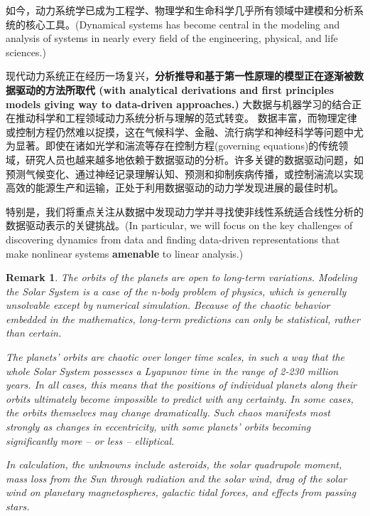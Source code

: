 \documentclass{ctexart}
\newtheorem*{remark}{Remark}
\begin{document}
如今，动力系统学已成为工程学、物理学和生命科学几乎所有领域中建模和分析系统的核心工具。(Dynamical systems
has become central in the modeling and analysis of systems in nearly every field of the
engineering, physical, and life sciences.)


现代动力系统正在经历一场复兴，\textbf{分析推导和基于第一性原理的模型正在逐渐被数据驱动的方法所取代 (with analytical derivations and first principles models giving way to data-driven approaches.)} 大数据与机器学习的结合正在推动科学和工程领域动力系统分析与理解的范式转变。
数据丰富，而物理定律或控制方程仍然难以捉摸，这在气候科学、金融、流行病学和神经科学等问题中尤为显著。即使在诸如光学和湍流等存在控制方程(governing equations)的传统领域，研究人员也越来越多地依赖于数据驱动的分析。许多关键的数据驱动问题，如预测气候变化、通过神经记录理解认知、预测和抑制疾病传播，或控制湍流以实现高效的能源生产和运输，正处于利用数据驱动的动力学发现进展的最佳时机。


特别是，我们将重点关注从数据中发现动力学并寻找使非线性系统适合线性分析的数据驱动表示的关键挑战。(In particular, we will focus on the key challenges of discovering dynamics from data and finding data-driven representations that {\color{red}make nonlinear systems \textbf{amenable} to linear analysis.})


\begin{remark}

The orbits of the planets are open to long-term variations. Modeling the Solar System is a case of the n-body problem of physics, which is generally unsolvable except by numerical simulation. Because of the chaotic behavior embedded in the mathematics, long-term predictions can only be statistical, rather than certain.

The planets' orbits are chaotic over longer time scales, in such a way that the whole Solar System possesses a Lyapunov time in the range of 2-230 million years. In all cases, this means that the positions of individual planets along their orbits ultimately become impossible to predict with any certainty. In some cases, the orbits themselves may change dramatically. Such chaos manifests most strongly as changes in eccentricity, with some planets' orbits becoming significantly more – or less – elliptical.

In calculation, the unknowns include asteroids, the solar quadrupole moment, mass loss from the Sun through radiation and the solar wind, drag of the solar wind on planetary magnetospheres, galactic tidal forces, and effects from passing stars.

\end{remark}
\end{document}
